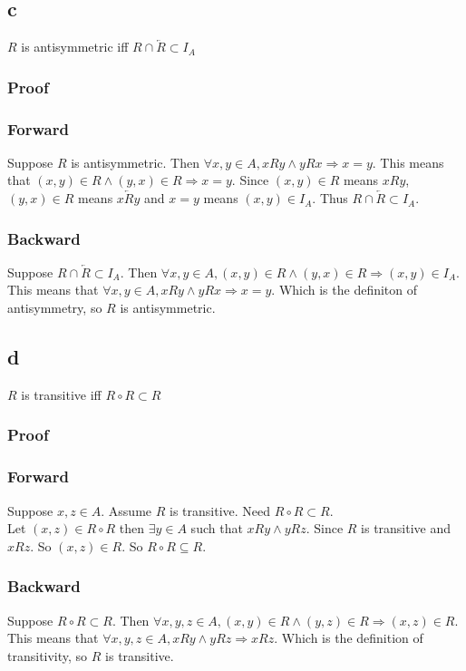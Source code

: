 \documentclass{article}
\begin{document}
\subsection*{c}
$R$ is antisymmetric iff $R \cap \overleftarrow{R} \subset I_A$
\subsubsection*{Proof}
\subsubsection*{Forward}
Suppose $R$ is antisymmetric. Then $\forall x, y \in A, xRy \land yRx \Rightarrow x = y$. This means that $(x, y) \in R \land (y, x) \in R \Rightarrow x = y$. Since $(x,y) \in R$ means $xRy$, $(y,x) \in R$ means $x\overleftarrow{R}y$ and $x=y$ means $(x, y) \in I_A$. Thus $R \cap \overleftarrow{R} \subset I_A$.
\subsubsection*{Backward}
Suppose $R \cap \overleftarrow{R} \subset I_A$. Then $\forall x, y \in A, (x, y) \in R \land (y, x) \in R \Rightarrow (x, y) \in I_A$. This means that $\forall x, y \in A, xRy \land yRx \Rightarrow x = y$. Which is the definiton of antisymmetry, so $R$ is antisymmetric.
\subsection*{d}
$R$ is transitive iff $R \circ R \subset R$
\subsubsection*{Proof}
\subsubsection*{Forward}
Suppose $x,z \in A$.
Assume $R$ is transitive.
Need $R \circ R \subset R$.\\
Let $(x,z) \in R \circ R$ then $\exists y \in A$ such that $xRy \land yRz$. Since $R$ is transitive and $xRz$. So $(x,z) \in R$. So $R \circ R \subseteq R$.

\subsubsection*{Backward}
Suppose $R \circ R \subset R$. Then $\forall x, y, z \in A, (x, y) \in R \land (y, z) \in R \Rightarrow (x, z) \in R$. This means that $\forall x, y, z \in A, xRy \land yRz \Rightarrow xRz$. Which is the definition of transitivity, so $R$ is transitive.
\end{document}
